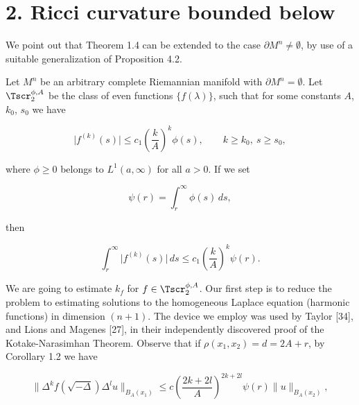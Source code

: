 \chapter{2. Ricci curvature bounded below}

We point out that Theorem 1.4 can be extended to the case $\partial M^n \neq \emptyset$, by
use of a suitable generalization of Proposition 4.2.

\bigskip

Let $M^n$ be an arbitrary complete Riemannian manifold with $\partial M^n = \emptyset$.
Let $\Tscr_2^{\phi,A}$ be the class of even functions $\{f(\lambda)\}$, such that for some constants
$A$, $k_0$, $s_0$ we have

\begin{equation}\tag{2.1}
\bigl|f^{(k)}(s)\bigr| \le c_1\left(\frac{k}{A}\right)^k \phi(s),\qquad k \ge k_0,\ s \ge s_0,
\end{equation}

where $\phi \ge 0$ belongs to $L^1(a,\infty)$ for all $a > 0$. If we set

\begin{equation}\tag{2.2}
\psi(r) = \int_r^\infty \phi(s)\,ds,
\end{equation}

then

\begin{equation}\tag{2.3}
\int_r^\infty \bigl|f^{(k)}(s)\bigr|\,ds \le c_1\left(\frac{k}{A}\right)^k \psi(r).
\end{equation}

We are going to estimate $k_f$ for $f \in \Tscr_2^{\phi,A}$. Our first step is to reduce the
problem to estimating solutions to the homogeneous Laplace equation
(harmonic functions) in dimension $(n+1)$. The device we employ was used by
Taylor [34], and Lions and Magenes [27], in their independently discovered
proof of the Kotake-Narasimhan Theorem. Observe that if $\rho(x_1, x_2) = d =
2A + r$, by Corollary 1.2 we have

\begin{equation}\tag{2.4}
\bigl\|\Delta^k f(\sqrt{-\Delta})\Delta^l u\bigr\|_{B_A(x_1)}
\le c\left(\frac{2k + 2l}{A}\right)^{2k+2l}\psi(r)\|u\|_{B_A(x_2)},
\end{equation}

